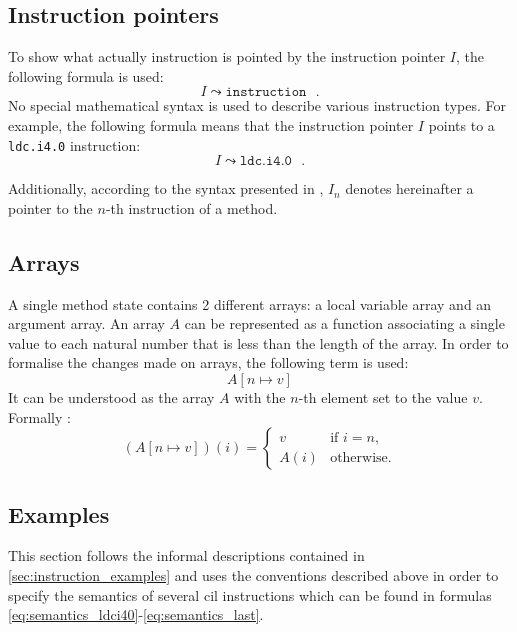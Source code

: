 \documentclass{article}
\numberwithin{equation}{section}
\newcommand{\ipointsto}[3] {
	#1 \leadsto \texttt{#2} \text{ } #3
}
\newcommand{\setarrayitem}[3] {
	#1[#2 \mapsto #3]
}
\begin{document}
\subsection{Instruction pointers}

To show what actually instruction is pointed by the instruction pointer $I$, the following formula is used:
\begin{equation}
	\ipointsto{I}{instruction}.
\end{equation}
No special mathematical syntax is used to describe various instruction types. For example, the following formula means that the instruction pointer $I$ points to a \texttt{ldc.i4.0} instruction:
$$
	\ipointsto{I}{ldc.i4.0}.
$$

Additionally, according to the syntax presented in \cite{zychlaThesis}, $I_n$ denotes hereinafter a pointer to the $n$-th instruction of a method.

\subsection{Arrays}

A single method state contains 2 different arrays: a local variable array and an argument array. An array $A$ can be represented as a function associating a single value to each natural number that is less than the length of the array. In order to formalise the changes made on arrays, the following term is used:
\begin{equation}
\label{eq:array_change}
	\setarrayitem{A}{n}{v}
\end{equation}
It can be understood as the array $A$ with the $n$-th element set to the value $v$. Formally \cite{zychlaThesis}:
\begin{equation}
\label{eq:array_change_formal}
	(\setarrayitem{A}{n}{v})(i) =
	\begin{cases}
		v		& \text{if } i = n,\\
		A(i)	& \text{otherwise.}
	\end{cases}
\end{equation}


\subsection{Examples}

This section follows the informal descriptions contained in \ref{sec:instruction_examples} and uses the conventions described above in order to specify the semantics of several \acrshort{cil} instructions which can be found in formulas \ref{eq:semantics_ldci40}-\ref{eq:semantics_last}.
\end{document}
